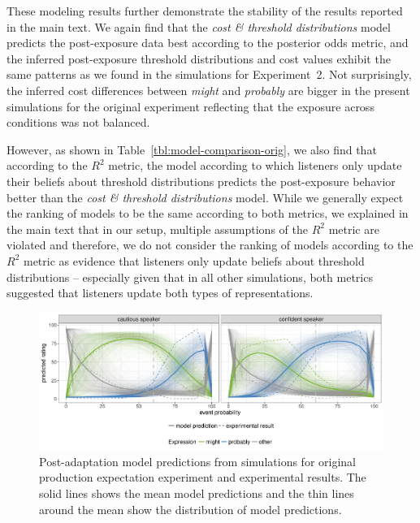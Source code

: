 \documentclass[man, floatsintext]{apa6}
\begin{document}
These modeling results further demonstrate the stability of the results reported in the main text. We again find that the \textit{cost \& threshold distributions} model predicts the post-exposure data best according to the posterior odds metric, and the inferred post-exposure threshold distributions and cost values exhibit the same patterns as we found in the simulations for Experiment~2. Not surprisingly, the inferred cost differences between \textit{might} and \textit{probably} are bigger in the present simulations for the original experiment reflecting that the exposure across conditions was not balanced. 

However, as shown in Table~\ref{tbl:model-comparison-orig}, we also find that according to the $R^2$ metric, the model according to which listeners only update their beliefs about threshold distributions predicts the post-exposure
behavior better than the  \textit{cost \& threshold distributions} model. While we generally expect the ranking of models to be the same according to both metrics, we explained in the main text that in our setup, multiple assumptions
of the $R^2$ metric are violated and therefore, we do not consider the ranking of models according to the $R^2$ metric as evidence that listeners only update beliefs about threshold distributions -- especially given that in all other simulations, both metrics suggested that listeners update both types of representations.





\begin{figure}[h!]
  \includegraphics[width=\textwidth]{plots/adaptation-posterior-predictions.pdf}
  \caption{Post-adaptation model predictions from simulations for original production expectation experiment and experimental results. 
  The solid lines shows the mean model predictions and the thin lines around the mean show the distribution of model predictions. \label{fig:post-exposure-model-original}}
\end{figure}
\end{document}
